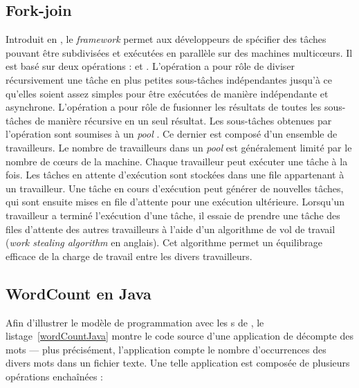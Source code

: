 \subsection{Fork-join}

Introduit en , le \emph{framework}  permet aux d\'eveloppeurs de sp\'ecifier des t\^aches pouvant \^etre subdivis\'ees et ex\'ecut\'ees en parall\`ele sur des machines multicœurs. Il est bas\'e sur deux op\'erations :  et . L'op\'eration  a pour r\^ole de diviser r\'ecursivement une t\^ache en plus petites sous-t\^aches ind\'ependantes jusqu'\`a ce qu'elles soient assez simples pour \^etre ex\'ecut\'ees de mani\`ere ind\'ependante et asynchrone. L'op\'eration  a pour r\^ole de fusionner les r\'esultats de toutes les sous-t\^aches de mani\`ere r\'ecursive en un seul r\'esultat.
Les sous-t\^aches obtenues par l'op\'eration  sont soumises \`a un \emph{pool} . Ce dernier est composé d'un ensemble de travailleurs. Le nombre de travailleurs dans un \emph{pool}  est g\'en\'eralement limit\'e par le nombre de cœurs de la machine. Chaque travailleur peut ex\'ecuter une t\^ache \`a la fois. Les t\^aches en attente d'ex\'ecution sont stock\'ees dans une file appartenant \`a un travailleur. Une t\^ache en cours d'ex\'ecution peut g\'en\'erer de nouvelles t\^aches, qui sont ensuite mises en file d'attente pour une ex\'ecution ult\'erieure. Lorsqu'un travailleur a termin\'e l'ex\'ecution d'une t\^ache, il essaie de prendre une t\^ache des files d'attente des autres travailleurs \`a l'aide d'un algorithme de vol de travail (\emph{work stealing algorithm} en anglais). Cet algorithme permet un \'equilibrage efficace de la charge de travail entre les divers travailleurs.


\subsection{WordCount en Java}

Afin d'illustrer le mod\`ele de programmation avec les s de , le listage~\ref{wordCountJava} montre le code source d'une application de d\'ecompte des mots --- plus pr\'ecis\'ement, l'application compte le nombre d'occurrences des divers mots dans un fichier texte. Une telle application est compos\'ee de plusieurs op\'erations encha\^in\'ees :


